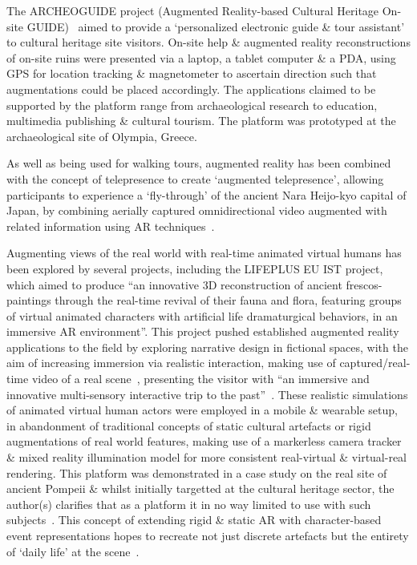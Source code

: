 The ARCHEOGUIDE project (Augmented Reality-based Cultural Heritage On-site GUIDE)~\cite{vlahakis:archeoguide} aimed to provide a `personalized electronic guide \& tour assistant' to cultural heritage site visitors. On-site help \& augmented reality reconstructions of on-site ruins were presented via a laptop, a tablet computer \& a PDA, using GPS for location tracking \& magnetometer to ascertain direction such that augmentations could be placed accordingly. The applications claimed to be supported by the platform range from archaeological research to education, multimedia publishing \& cultural tourism. The platform was prototyped at the archaeological site of Olympia, Greece.

As well as being used for walking tours, augmented reality has been combined with the concept of telepresence to create `augmented telepresence', allowing participants to experience a `fly-through' of the ancient Nara Heijo-kyo capital of Japan, by combining aerially captured omnidirectional video augmented with related information using AR techniques~\cite{Okura2006,Okura2011}.

Augmenting views of the real world with real-time animated virtual humans has been explored by several projects, including the LIFEPLUS EU IST project, which aimed to produce ``an innovative 3D reconstruction of ancient frescos-paintings through the real-time revival of their fauna and flora, featuring groups of virtual animated characters with artificial life dramaturgical behaviors, in an immersive AR environment''. This project pushed established augmented reality applications to the field by exploring narrative design in fictional spaces, with the aim of increasing immersion via realistic interaction, making use of captured/real-time video of a real scene~\cite{Papagiannakis2004}, presenting the visitor with ``an immersive and innovative multi-sensory interactive trip to the past''~\cite{Papagiannakis2005}. These realistic simulations of animated virtual human actors were employed in a mobile \& wearable setup, in abandonment of traditional concepts of static cultural artefacts or rigid augmentations of real world features, making use of a markerless camera tracker \& mixed reality illumination model for more consistent real-virtual \& virtual-real rendering. This platform was demonstrated in a case study on the real site of ancient Pompeii \& whilst initially targetted at the cultural heritage sector, the author(s) clarifies that as a platform it in no way limited to use with such subjects~\cite{Papagiannakis2007}. This concept of extending rigid \& static AR with character-based event representations hopes to recreate not just discrete artefacts but the entirety of `daily life' at the scene~\cite{Papagiannakis2009}.

